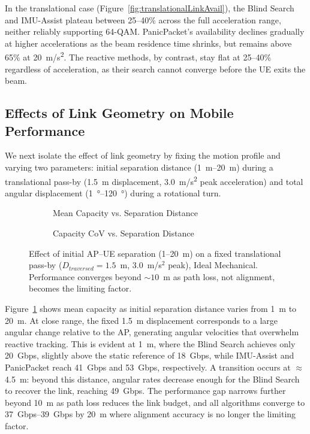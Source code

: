 \documentclass[fleqn,10pt]{wlscirep}
\begin{document}
In the translational case (Figure~\ref{fig:translationalLinkAvail}), the Blind Search and IMU-Assist plateau between 25--40\% across the full acceleration range, neither reliably supporting 64-QAM. PanicPacket's availability declines gradually at higher accelerations as the beam residence time shrinks, but remains above 65\% at \SI{20}{m/s^2}. The reactive methods, by contrast, stay flat at 25--40\% regardless of acceleration, as their search cannot converge before the UE exits the beam.

\subsection*{Effects of Link Geometry on Mobile Performance}

We next isolate the effect of link geometry by fixing the motion profile and varying two parameters: initial separation distance (\SIrange{1}{20}{m}) during a translational pass-by (\SI{1.5}{m} displacement, \SI{3.0}{m/s^2} peak acceleration) and total angular displacement (\SIrange{1}{120}{\degree}) during a rotational turn.

\begin{figure}[h!]
    \centering
    \begin{subfigure}{0.495\linewidth}
        
        \vspace{-20pt}
        \caption{Mean Capacity vs. Separation Distance}
        \label{fig:dist_rate}
    \end{subfigure}
    \hfill
    \begin{subfigure}{0.495\linewidth}
        
        \vspace{-20pt}
        \caption{Capacity CoV vs. Separation Distance}
        \label{fig:dist_cov}
    \end{subfigure}
    \caption{Effect of initial AP--UE separation (1--20~m) on a fixed translational pass-by ($D_{traversed} = 1.5$~m, $3.0$~m/s$^2$ peak), Ideal Mechanical. Performance converges beyond ${\sim}10$~m as path loss, not alignment, becomes the limiting factor.}
    \vspace{-5pt}
\end{figure} 

Figure~\ref{fig:dist_rate} shows mean capacity as initial separation distance varies from \SI{1}{m} to \SI{20}{m}. At close range, the fixed \SI{1.5}{m} displacement corresponds to a large angular change relative to the AP, generating angular velocities that overwhelm reactive tracking. This is evident at \SI{1}{m}, where the Blind Search achieves only \SI{20}{Gbps}, slightly above the static reference of \SI{18}{Gbps}, while IMU-Assist and PanicPacket reach \SI{41}{Gbps} and \SI{53}{Gbps}, respectively. A transition occurs at $\approx$\SI{4.5}{m}: beyond this distance, angular rates decrease enough for the Blind Search to recover the link, reaching \SI{49}{Gbps}. The performance gap narrows further beyond \SI{10}{m} as path loss reduces the link budget, and all algorithms converge to \SIrange{37}{39}{Gbps} by \SI{20}{m} where alignment accuracy is no longer the limiting factor.
\end{document}

